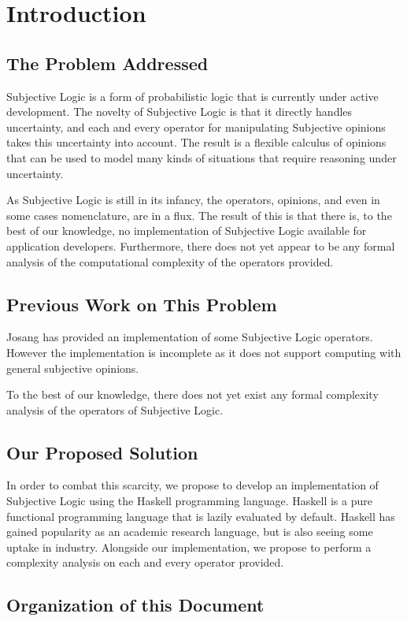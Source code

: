 \documentclass[thesis.tex]{subfiles}
\begin{document}
\chapter{Introduction}


\section{The Problem Addressed}

Subjective Logic is a form of probabilistic logic that is currently
under active development. The novelty of Subjective Logic is that it
directly handles uncertainty, and each and every operator for manipulating
Subjective opinions takes this uncertainty into account. The result is a
flexible calculus of opinions that can be used to model many kinds of
situations that require reasoning under uncertainty.

As Subjective Logic is still in its infancy, the operators, opinions, and
even in some cases nomenclature, are in a flux. The result of this is that
there is, to the best of our knowledge, no implementation of Subjective
Logic available for application developers. Furthermore, there does not
yet appear to be any formal analysis of the computational complexity of
the operators provided.


\section{Previous Work on This Problem}

Josang has provided an implementation of some Subjective Logic operators.
However the implementation is incomplete as it does not support computing
with general subjective opinions.

To the best of our knowledge, there does not yet exist any formal complexity
analysis of the operators of Subjective Logic.


\section{Our Proposed Solution}

In order to combat this scarcity, we propose to develop an implementation
of Subjective Logic using the Haskell programming language. Haskell is
a pure functional programming language that is lazily evaluated by default.
Haskell has gained popularity as an academic research language, but is also
seeing some uptake in industry. Alongside our implementation, we propose to
perform a complexity analysis on each and every operator provided.


\section{Organization of this Document}
\end{document}

